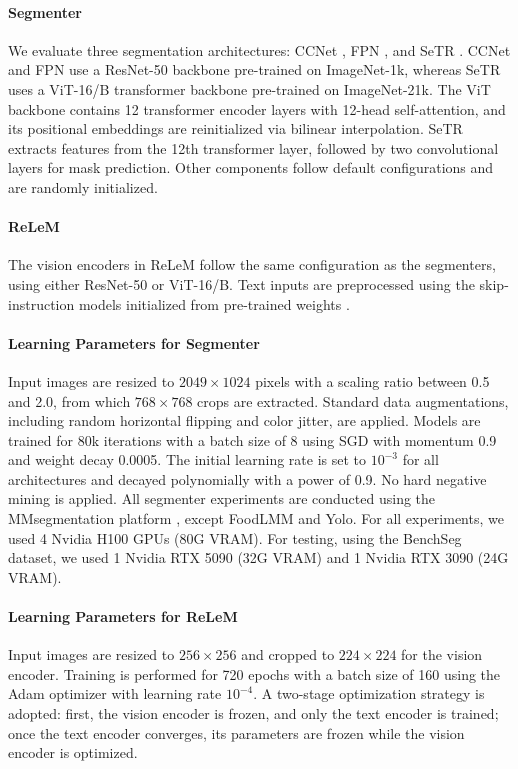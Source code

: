 \documentclass[preprint,12pt]{elsarticle}
\begin{document}
\paragraph{Segmenter}
\label{par:segmenter}
We evaluate three segmentation architectures: CCNet \cite{huang2019ccnet}, FPN \citep{siddiqui2023panoptic}, and SeTR \cite{zheng2021rethinking}. CCNet and FPN use a ResNet-50 \citep{wu2021large} backbone pre-trained on ImageNet-1k, whereas SeTR uses a ViT-16/B \cite{zheng2021rethinking} transformer backbone pre-trained on ImageNet-21k. The ViT backbone contains 12 transformer encoder layers with 12-head self-attention, and its positional embeddings are reinitialized via bilinear interpolation. SeTR extracts features from the 12th transformer layer, followed by two convolutional layers for mask prediction. Other components follow default configurations and are randomly initialized.

\paragraph{ReLeM}
\label{par:relem}
The vision encoders in ReLeM follow the same configuration as the segmenters, using either ResNet-50 or ViT-16/B. Text inputs are preprocessed using the skip-instruction models initialized from pre-trained weights \cite{marin2021recipe1m+}.

\paragraph{Learning Parameters for Segmenter}
\label{par:learn-seg}
Input images are resized to $2049 \times 1024$ pixels with a scaling ratio between 0.5 and 2.0, from which $768 \times 768$ crops are extracted. Standard data augmentations, including random horizontal flipping and color jitter, are applied. Models are trained for 80k iterations with a batch size of 8 using SGD with momentum 0.9 and weight decay 0.0005. The initial learning rate is set to $10^{-3}$ for all architectures and decayed polynomially with a power of 0.9. No hard negative mining is applied. All segmenter experiments are conducted using the MMsegmentation platform \citep{contributors2020mmsegmentation}, except FoodLMM and Yolo. For all experiments, we used 4 Nvidia H100 GPUs (80G VRAM). For testing, using the BenchSeg dataset, we used 1 Nvidia RTX 5090 (32G VRAM) and 1 Nvidia RTX 3090 (24G VRAM). 

\paragraph{Learning Parameters for ReLeM}
\label{par:learn-relem}
Input images are resized to $256 \times 256$ and cropped to $224 \times 224$ for the vision encoder. Training is performed for 720 epochs with a batch size of 160 using the Adam optimizer \citep{adam2014method} with learning rate $10^{-4}$. A two-stage optimization strategy is adopted: first, the vision encoder is frozen, and only the text encoder is trained; once the text encoder converges, its parameters are frozen while the vision encoder is optimized.
\end{document}

